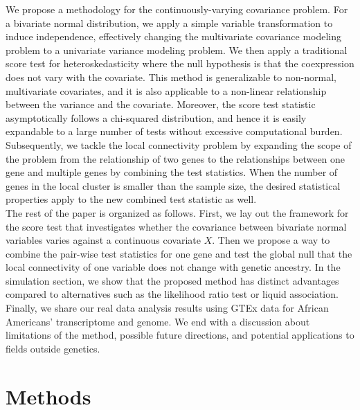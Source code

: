 \documentclass[aoas,preprint]{imsart}
\numberwithin{equation}{section}
\theoremstyle{plain}
\begin{document}
We propose a methodology for the continuously-varying covariance problem. For a bivariate normal distribution, we apply a simple variable transformation to induce independence, effectively changing the multivariate covariance modeling problem to a univariate variance modeling problem. We then apply a traditional score test for heteroskedasticity \cite{breusch1979simple} where the null hypothesis is that the coexpression does not vary with the covariate. This method is generalizable to non-normal, multivariate covariates, and it is also applicable to a non-linear relationship between the variance and the covariate. Moreover, the score test statistic asymptotically follows a chi-squared distribution, and hence it is easily expandable to a large number of tests without excessive computational burden. Subsequently, we tackle the local connectivity problem by expanding the scope of the problem from the relationship of two genes to the relationships between one gene and multiple genes by combining the test statistics. When the number of genes in the local cluster is smaller than the sample size, the desired statistical properties apply to the new combined test statistic as well. \\

The rest of the paper is organized as follows. First, we lay out the framework for the score test that investigates whether the covariance between bivariate normal variables varies against a continuous covariate $X$. Then we propose a way to combine the pair-wise test statistics for one gene and test the global null that the local connectivity of one variable does not change with genetic ancestry. In the simulation section, we show that the proposed method has distinct advantages compared to alternatives such as the likelihood ratio test or liquid association. Finally, we share our real data analysis results using GTEx data for African Americans' transcriptome and genome. We end with a discussion about limitations of the method, possible future directions, and potential applications to fields outside genetics.


\section{Methods}
\end{document}
